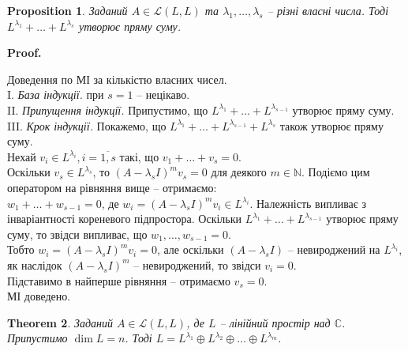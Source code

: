 \documentclass[a4paper, 10pt]{article}
\makeatletter
\theoremstyle{theoremdd}
\newtheorem{theorem}{Theorem}[subsection]
\newtheorem{proposition}[theorem]{Proposition}
\renewenvironment{proof}[1][Proof.\\]{\par
\pushQED{\hfill \qed}%
\normalfont \topsep6\p@\@plus6\p@\relax
\trivlist
\item\relax
{\bfseries
#1\@addpunct{.}}\hspace\labelsep\ignorespaces
}{%
\popQED\endtrivlist\@endpefalse
}
\makeatother
\begin{document}
\begin{proposition}
Заданий $A \in \mathcal{L}(L,L)$ та $\lambda_1,\dots,\lambda_s$ -- різні власні числа. Тоді $L^{\lambda_1}+\dots +L^{\lambda_s}$ утворює пряму суму.
\end{proposition}

\begin{proof}
Доведення по МІ за кількістю власних чисел.\\
I. \textit{База індукції.} при $s = 1$ -- нецікаво.\\
II. \textit{Припущення індукції.} Припустимо, що $L^{\lambda_1}+\dots +L^{\lambda_{s-1}}$ утворює пряму суму. \\
III. \textit{Крок індукції.} Покажемо, що $L^{\lambda_1}+\dots + L^{\lambda_{s-1}} + L^{\lambda_s}$ також утворює пряму суму. \\ Нехай $v_i \in L^{\lambda_i}, i = \overline{1,s}$ такі, що $v_1+\dots+v_s = 0$.\\
Оскільки $v_s \in L^{\lambda_s}$, то $(A-\lambda_s I)^m v_s = 0$ для деякого $m \in \mathbb{N}$. Подіємо цим оператором на рівняння вище -- отримаємо:\\
$w_1 + \dots + w_{s-1} = 0$, де $w_i = (A-\lambda_s I)^m v_i \in L^{\lambda_i}$. Належність випливає з інваріантності кореневого підпростора. Оскільки $L^{\lambda_1}+\dots +L^{\lambda_{s-1}}$ утворює пряму суму, то звідси випливає, що $w_1,\dots,w_{s-1} = 0$.\\
Тобто $w_i = (A-\lambda_s I)^m v_i = 0$, але оскільки $(A-\lambda_s I)$ -- невироджений на $L^{\lambda_i}$, як наслідок  $(A-\lambda_s I)^m$ -- невироджений, то звідси $v_i = 0$.\\
Підставимо в найперше рівняння -- отримаємо $v_s = 0$.\\
МІ доведено.
\end{proof}

\begin{theorem}
\label{space_decomposition_into_generalized_eigenspace}
Заданий $A \in \mathcal{L}(L,L)$, де $L$ -- лінійний простір над $\mathbb{C}$. Припустимо $\dim L = n$. Тоді $L = L^{\lambda_1} \oplus L^{\lambda_2} \oplus \dots \oplus L^{\lambda_m}$.
\end{theorem}
\end{document}
